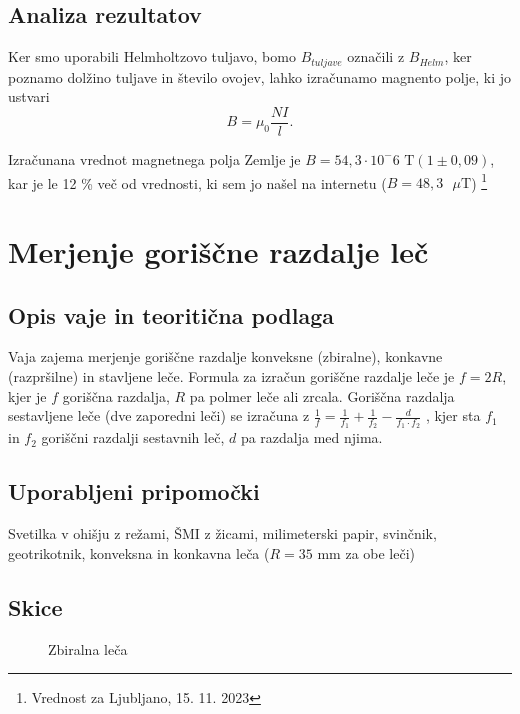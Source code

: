 \documentclass[12pt]{article}
\begin{document}
	\subsection*{Analiza rezultatov}
	Ker smo uporabili Helmholtzovo tuljavo, bomo $B_{tuljave}$ označili z $B_{Helm}$, ker 
	poznamo dolžino tuljave in število ovojev, lahko izračunamo magnento polje, ki jo ustvari
	\begin{equation}
		B = \mu_0 \frac{NI}{l}.
	\end{equation}

	Izračunana vrednot magnetnega polja Zemlje je $B = 54,3 \cdot 10^-6 \text{ T} (1 \pm 0,09)$,
	kar je le 12 \% več od vrednosti, ki sem jo našel na internetu \cite{noaa} ($B = 48,3 \text{ } \mu \text{T} $)
	\footnote{Vrednost za Ljubljano, 15. 11. 2023}

\newpage
\section{Merjenje goriščne razdalje leč}
	\subsection*{Opis vaje in teoritična podlaga}
	Vaja zajema merjenje goriščne razdalje konveksne (zbiralne), konkavne (razpršilne) in 
	stavljene leče. Formula za izračun goriščne razdalje leče je $f = 2R$, kjer je $f$ 
	goriščna razdalja, $R$ pa polmer leče ali zrcala. Goriščna razdalja sestavljene leče
	(dve zaporedni leči) se izračuna z $\frac{1}{f} = \frac{1}{f_1} + \frac{1}{f_2} - \frac{d}{f_1 \cdot f_2}$
	\cite{lece}, kjer sta $f_1$ in $f_2$ goriščni razdalji sestavnih leč, $d$ pa razdalja med njima.

	\subsection*{Uporabljeni pripomočki}
	Svetilka v ohišju z režami, ŠMI z žicami, milimeterski papir, svinčnik, geotrikotnik, 
	konveksna in konkavna leča ($R = 35 \text{ mm}$ za obe leči)
	\subsection*{Skice}
	
	\begin{figure}[h!]
		\centering
		\caption{Zbiralna leča}
	\end{figure}
	
\end{document}

